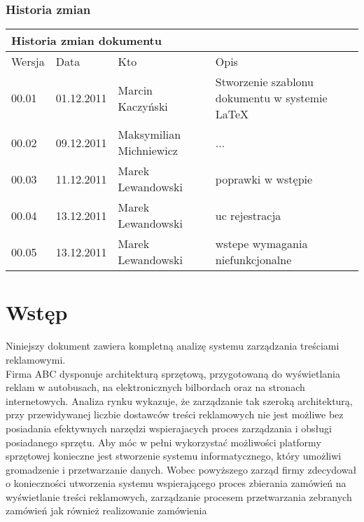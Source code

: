 \documentclass[10pt,a4paper,titlepage]{article} %
\begin{document}
	\subsubsection*{Historia zmian}
		\begin{table}[h]
		\begin{tabular}{|m{1cm}|m{2cm}|m{3.5cm}|m{6.5cm}|}
			\hline
			\multicolumn{4}{|l|}{Historia zmian dokumentu} \\
			\hline
			\hline Wersja  & Data & Kto & Opis  \\ 
			\hline 00.01 & 01.12.2011 & Marcin Kaczyński & Stworzenie szablonu dokumentu w systemie \LaTeX \\ 
			\hline 00.02 & 09.12.2011 & Maksymilian Michniewicz & ... \\ 
			\hline 00.03 & 11.12.2011 & Marek Lewandowski & poprawki w wstępie \\ 
			\hline 00.04 & 13.12.2011 & Marek Lewandowski & uc rejestracja \\ 
			\hline 00.05 & 13.12.2011 & Marek Lewandowski & wstepe wymagania
			niefunkcjonalne
			\\
			\hline 
		\end{tabular} 
		\end{table}
	\newpage

	
	\tableofcontents
	\newpage
	

	\section{Wstęp}

		Niniejszy dokument zawiera kompletną analizę systemu zarządzania treściami
		reklamowymi.\\ 
		
		Firma ABC dysponuje architekturą sprzętową, przygotowaną do wyświetlania
		reklam w autobusach, na elektronicznych bilbordach oraz na stronach
		internetowych. Analiza rynku wykazuje, że zarządzanie tak szeroką architekturą,
		przy przewidywanej liczbie dostawców treści reklamowych nie jest możliwe
		bez posiadania efektywnych narzędzi wspierajacych proces zarządzania i obsługi
		posiadanego sprzętu. Aby móc w pełni wykorzystać możliwości platformy sprzętowej
		konieczne jest stworzenie systemu informatycznego, który umożliwi gromadzenie i 
		przetwarzanie danych. Wobec powyższego zarząd firmy zdecydował o konieczności
		utworzenia systemu wspierającego proces zbierania zamówień na wyświetlanie
		treści reklamowych, zarządzanie procesem przetwarzania zebranych zamówień jak 
		również realizowanie zamówienia\\
		
\end{document}

